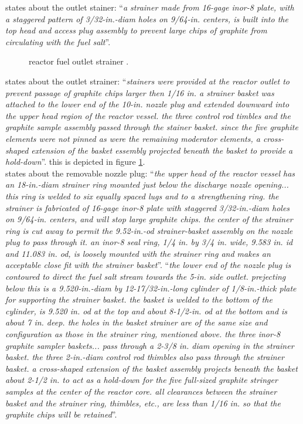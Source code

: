 \documentclass{article}
\newcommand*{\mrsarchive}{../../msr-archive}%
\begin{document}
\parencite[page 84-85]{ornl-tm-0728} states about the outlet stainer:
\enquote{\textit{a strainer made from 16-gage inor-8 plate, with a staggered pattern of 3/32-in.-diam holes on 9/64-in. centers, is built into the top head and access plug assembly to prevent large chips of graphite from circulating with the fuel salt}}.

\begin{figure}[H]
  \centering
  \centering
  \caption{reactor fuel outlet strainer \parencite[figure 5.11]{ornl-tm-3229}.}
  \label{3039-fig5-11}
\end{figure}

\textcite[page 115]{ornl-tm-3039} states about the outlet strainer:
\enquote{\textit{stainers were provided at the reactor outlet to prevent passage of graphite chips larger then 1/16 in. a strainer basket was attached to the lower end of the 10-in. nozzle plug and extended downward into the upper head region of the reactor vessel. the three control rod timbles and the graphite sample assembly passed through the stainer basket. since the five graphite elements were not pinned as were the remaining moderator elements, a cross-shaped extension of the basket essembly projected beneath the basket to provide a hold-down}}. this is depicted in figure \ref{3039-fig5-11}. \\


\parencite[page 105]{ornl-tm-0728} states about the removable nozzle plug:
\enquote{\textit{the upper head of the reactor vessel has an 18-in.-diam strainer ring mounted just below the discharge nozzle opening... this ring is welded to six equally spaced lugs and to a strengthening ring. the strainer is fabricated of 16-gage inor-8 plate with staggered 3/32-in.-diam holes on 9/64-in. centers, and will stop large graphite chips. the center of the strainer ring is cut away to permit the 9.52-in.-od strainer-basket assembly on the nozzle plug to pass through it. an inor-8 seal ring, 1/4 in. by 3/4 in. wide, 9.583 in. id and 11.083 in. od, is loosely mounted with the strainer ring and makes an acceptable close fit with the strainer basket}}.
\enquote{\textit{the lower end of the nozzle plug is contoured to direct the fuel salt stream towards the 5-in. side outlet. prejecting below this is a 9.520-in.-diam by 12-17/32-in.-long cylinder of 1/8-in.-thick plate for supporting the strainer basket. the basket is welded to the bottom of the cylinder, is 9.520 in. od at the top and about 8-1/2-in. od at the bottom and is about 7 in. deep. the holes in the basket strainer are of the same size and configuration as those in the strainer ring, mentioned above. the three inor-8 graphite sampler baskets... pass through a 2-3/8 in. diam opening in the strainer basket. the three 2-in.-diam control rod thimbles also pass through the strainer basket. a cross-shaped extension of the basket assembly projects beneath the basket about 2-1/2 in. to act as a hold-down for the five full-sized graphite stringer samples at the center of the reactor core. all clearances between the strainer basket and the strainer ring, thimbles, etc., are less than 1/16 in. so that the graphite chips will be retained}}.
\end{document}
